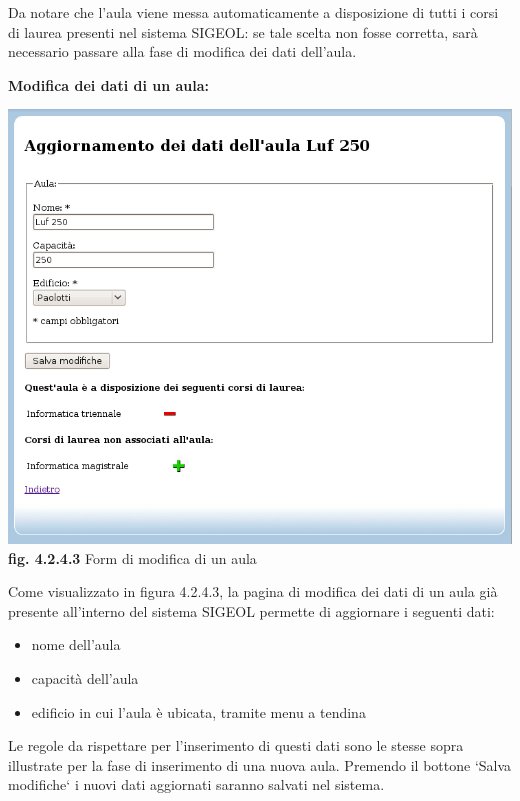 \documentclass[11pt,a4paper]{article}
\begin{document}
Da notare che l'aula viene messa automaticamente a disposizione di tutti i corsi di laurea presenti nel sistema SIGEOL: se tale scelta non fosse corretta, sarà necessario passare alla fase di modifica dei dati dell'aula.
\newline \newline \newline
\begin{large}\textbf{Modifica dei dati di un aula:}\end{large}
\bigskip
\begin{center}
	\includegraphics[scale=0.5]{images/modifica_aula.jpg}\\
	\textbf{fig. 4.2.4.3} Form di modifica di un aula\\
\end{center}
\bigskip

Come visualizzato in figura 4.2.4.3, la pagina di modifica dei dati di un aula già presente all'interno del sistema SIGEOL permette di aggiornare i seguenti dati:
\begin{itemize}
 \item nome dell'aula
 \item capacità dell'aula
 \item edificio in cui l'aula è ubicata, tramite menu a tendina
\end{itemize}
Le regole da rispettare per l'inserimento di questi dati sono le stesse sopra illustrate per la fase di inserimento di una nuova aula.
Premendo il bottone `Salva modifiche` i nuovi dati aggiornati saranno salvati nel sistema.
\end{document}
